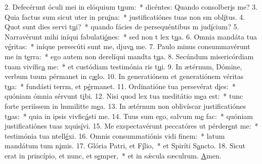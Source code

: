 2. Defecérunt óculi mei in elóquium t\uline{u}um:~* dicéntes: Quando consolber\uline{i}s me?
3. Quia factus sum sicut uter in pru\uline{í}na:~* justificatiónes tuas non sm obl\uline{í}tus.
4. Quot sunt dies servi t\uline{u}i?~* quando fácies de persequéntibus m jud\uline{í}cium?
5. Narravérunt mihi iníqui fabulati\uline{ó}nes:~* sed non t lex t\uline{u}a.
6. Omnia mandáta tua v\uline{é}ritas:~* iníque persecúti sunt me, djuv\uline{a} me.
7. Paulo minus consummavérunt me in t\uline{e}rra:~* ego autem non derelíqui mandta t\uline{u}a.
8. Secúndum misericórdiam tuam vivífic\uline{a} me:~* et custódiam testimónia ris t\uline{u}i.
9. In ætérnum, Dómine, verbum tuum pérmanet in c\uline{æ}lo.
10. In generatiónem et generatiónem véritas t\uline{u}a:~* fundásti terrm, et p\uline{é}rmanet.
11. Ordinatióne tua persevérat d\uline{i}es:~* quóniam ómnia sérvunt t\uline{i}bi.
12. Nisi quod lex tua meditátio m\uline{e}a est:~* tunc forte periíssem in humilitte m\uline{e}a.
13. In ætérnum non oblivíscar justificatiónes t\uline{u}as:~* quia in ipsis vivfic\uline{á}sti me.
14. Tuus sum ego, salvum m\uline{e} fac:~* quóniam justificatiónes tuas xquis\uline{í}vi.
15. Me exspectavérunt peccatóres ut pérder\uline{e}nt me:~* testimónia tua ntell\uline{é}xi.
16. Omnis consummatiónis vidi f\uline{i}nem:~* latum mandátum tum n\uline{i}mis.
17. Glória Patri, et F\uline{í}lio,~* et Spiríti S\uline{a}ncto.
18. Sicut erat in princípio, et nunc, et s\uline{e}mper,~* et in sǽcula sæculrum. \uline{A}men.
